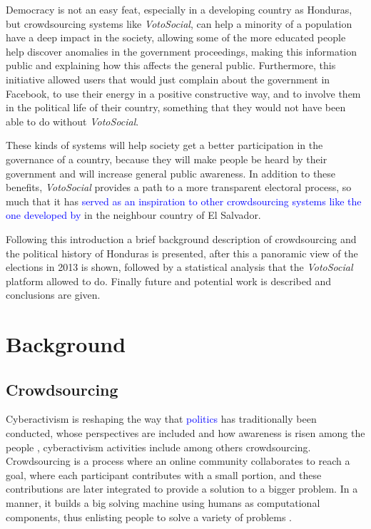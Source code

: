 \documentclass[letterpaper,10pt]{article}
\begin{document}
Democracy is not an easy feat, especially in a developing country as Honduras, but crowdsourcing systems like \textit{VotoSocial}, can help a minority of a population have a deep impact in the society, allowing some of the more educated people help discover anomalies in the government proceedings, making this information public and explaining how this affects the general public. Furthermore, this initiative allowed users that would just complain about the government in Facebook, to use their energy in a positive constructive way, and to involve them in the political life of their country, something that they would not have been able to do without \textit{VotoSocial}.

These kinds of systems will help society get a better participation in the governance of a country, because they will make people be heard by their government and will increase general public awareness. In addition to these benefits, \textit{VotoSocial} provides a path to a more transparent electoral process, so much that it has \textcolor{blue}{served as an inspiration to other crowdsourcing systems like the one developed by \citep{contemosnosotros}} in the neighbour country of El Salvador. 

Following this introduction a brief background description of crowdsourcing and the political history of Honduras is presented, after this a panoramic view of the elections in 2013 is shown, followed by a statistical analysis that the \textit{VotoSocial} platform allowed to do. Finally future and potential work is described and conclusions are given.


\section{Background}

\subsection{Crowdsourcing}

Cyberactivism is reshaping the way that \textcolor{blue}{politics} has traditionally been conducted, whose perspectives are included and how awareness is risen among the people \citep{milan2013}, cyberactivism activities include among others crowdsourcing. Crowdsourcing is a process where an online community collaborates to reach a goal, where each participant contributes with a small portion, and these contributions are later integrated to provide a solution to a bigger problem. In a manner, it builds a big solving machine using humans as computational components, thus enlisting people to solve a variety of problems \citep{doan2011}.
\end{document}
